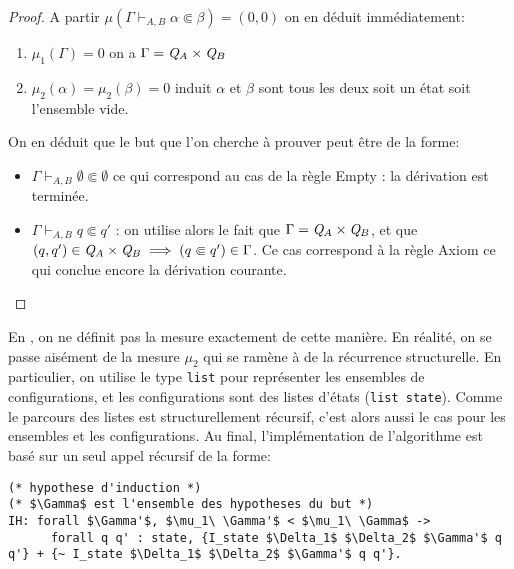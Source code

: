 \begin{proof}
  A partir $\mu(\Gamma \vdash_{A, B} \alpha \Subset \beta) = (0, 0)$ on en déduit immédiatement:
  \begin{enumerate}
  \item $\mu_1(\Gamma) = 0$ on a $\Gamma = \mathit Q_A \times \mathit Q_B$ 
  \item $\mu_2(\alpha) = \mu_2(\beta) = 0$ induit $\alpha$ et $\beta$ sont tous les deux soit un état soit l'ensemble vide.
  \end{enumerate}
  On en déduit que le but que l'on cherche à prouver peut être de la forme:
  \begin{itemize}
  \item $\Gamma \vdash_{A, B} \emptyset \Subset \emptyset$ ce qui correspond au cas de la règle Empty : la dérivation est terminée.
  \item $\Gamma \vdash_{A, B} q \Subset q'$ : on utilise alors le fait que
    $\Gamma = \mathit Q_A \times \mathit Q_B$, et que $(q, q') \in \mathit Q_A\times\mathit Q_B \; \Longrightarrow \;
    (q \Subset q') \in \Gamma$. Ce cas correspond à la règle Axiom ce qui conclue encore la dérivation courante.
  \end{itemize}
\end{proof}

En \coq, on ne définit pas la mesure exactement de cette manière. En réalité, on se passe aisément
de la mesure $\mu_2$ qui se ramène à de la récurrence structurelle. 
En particulier, on utilise le type \lstinline!list! pour représenter les ensembles de configurations,
et les configurations sont des listes d'états (\lstinline!list state!). Comme le parcours des listes 
est structurellement récursif, c'est alors aussi le cas pour les ensembles et les configurations.
Au final, l'implémentation de l'algorithme est basé sur un seul appel récursif de la forme:
\begin{lstlisting}
(* hypothese d'induction *)
(* $\Gamma$ est l'ensemble des hypotheses du but *)
IH: forall $\Gamma'$, $\mu_1\ \Gamma'$ < $\mu_1\ \Gamma$ ->
      forall q q' : state, {I_state $\Delta_1$ $\Delta_2$ $\Gamma'$ q q'} + {~ I_state $\Delta_1$ $\Delta_2$ $\Gamma'$ q q'}.
\end{lstlisting}

